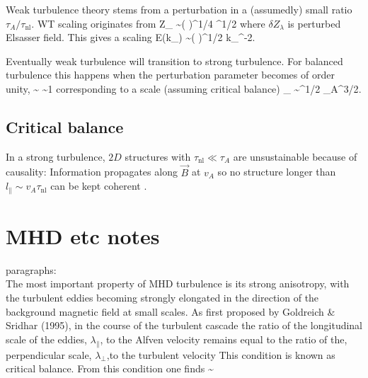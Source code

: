 \documentclass{aa}
\begin{document}
Weak turbulence theory stems from a perturbation in a (assumedly) small ratio $\tau_A/\tau_{\mathrm{nl}}$.
WT scaling originates from
\be
\delta Z_{\lambda} \sim \left(  \right)^{1/4} \lambda^{1/2}
\ee
where $\delta Z_{\lambda}$ is perturbed Elsasser field.
This gives a scaling
\be
E(k_{\perp}) \sim \left(  \right)^{1/2} k_{\perp}^{-2}.
\ee

Eventually weak turbulence will transition to strong turbulence.
For balanced turbulence this happens when the perturbation parameter becomes of order unity,
\be
{} \sim {} \sim 1
\ee
corresponding to a scale (assuming critical balance)
\be
\lambda_{} \sim \epsilon^{1/2} \tau_A^{3/2}.
\ee

\subsection{Critical balance}

In a strong turbulence, $2D$ structures with $\tau_{\mathrm{nl}} \ll \tau_A$ are unsustainable because of causality:
Information propagates along $\vec{B}$ at $v_A$ so no structure longer than $l_{\parallel} \sim v_A \tau_{\mathrm{nl}}$ can be kept coherent \citep{Boldyrev_2005}.




\section{MHD etc notes}
\citep{Sobacchi_2019} paragraphs: \\

The most important property of MHD turbulence is its strong anisotropy, with the turbulent eddies becoming strongly elongated in the direction of the background magnetic field at small scales.
As first proposed by Goldreich \& Sridhar (1995), in the course of the turbulent cascade the ratio of the longitudinal scale of the eddies, $\lambda_{\parallel}$, to the Alfven velocity remains equal to the ratio of the, perpendicular scale, $\lambda_{\perp}$,to the turbulent velocity 
This condition is known as critical balance. 
From this condition one finds
\be
\frac{\lambda_{\perp}}{\lambda_{\parallel}} \sim {}
\ee
\end{document}
